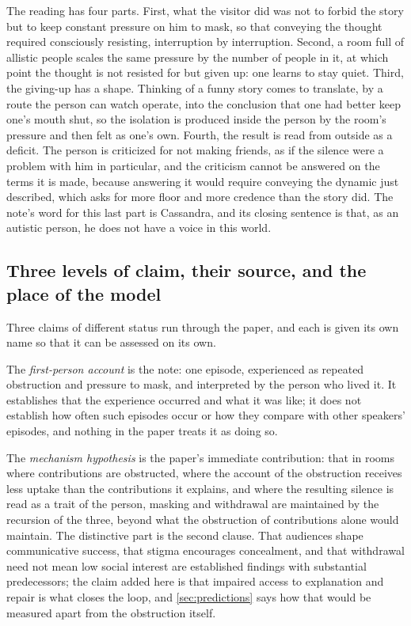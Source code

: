The reading has four parts. First, what the visitor did was not to forbid the story but to keep constant pressure on him to mask, so that conveying the thought required consciously resisting, interruption by interruption. Second, a room full of allistic people scales the same pressure by the number of people in it, at which point the thought is not resisted for but given up: one learns to stay quiet. Third, the giving-up has a shape. Thinking of a funny story comes to translate, by a route the person can watch operate, into the conclusion that one had better keep one's mouth shut, so the isolation is produced inside the person by the room's pressure and then felt as one's own. Fourth, the result is read from outside as a deficit. The person is criticized for not making friends, as if the silence were a problem with him in particular, and the criticism cannot be answered on the terms it is made, because answering it would require conveying the dynamic just described, which asks for more floor and more credence than the story did. The note's word for this last part is Cassandra, and its closing sentence is that, as an autistic person, he does not have a voice in this world.

\subsection{Three levels of claim, their source, and the place of the model}

Three claims of different status run through the paper, and each is given its own name so that it can be assessed on its own.

The \emph{first-person account} is the note: one episode, experienced as repeated obstruction and pressure to mask, and interpreted by the person who lived it. It establishes that the experience occurred and what it was like; it does not establish how often such episodes occur or how they compare with other speakers' episodes, and nothing in the paper treats it as doing so.

The \emph{mechanism hypothesis} is the paper's immediate contribution: that in rooms where contributions are obstructed, where the account of the obstruction receives less uptake than the contributions it explains, and where the resulting silence is read as a trait of the person, masking and withdrawal are maintained by the recursion of the three, beyond what the obstruction of contributions alone would maintain. The distinctive part is the second clause. That audiences shape communicative success, that stigma encourages concealment, and that withdrawal need not mean low social interest are established findings with substantial predecessors; the claim added here is that impaired access to explanation and repair is what closes the loop, and \autoref{sec:predictions} says how that would be measured apart from the obstruction itself.

